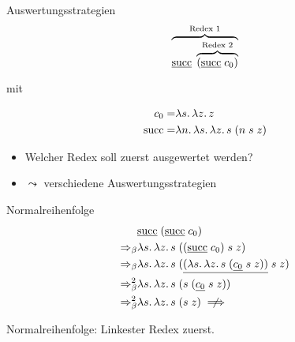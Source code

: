 \documentclass{beamer}
\begin{document}
\begin{frame}{Auswertungsstrategien}
        \begin{equation*}
          \overbrace{\app{
              \uline{\csucc}
            }{
              \overbrace{(\app{\uline{\csucc}}{\cn{0}})}^{\text{Redex 2}}
            }}^{\text{Redex 1}}
        \end{equation*}

        mit

        \begin{eqnarray*}
          c_{0} =& \lambda s.\, \lambda z.\, z \\
          \text{succ} =& \lambda n.\, \lambda s.\, \lambda z.\, s\;(n\;s\;z)
        \end{eqnarray*}

	\begin{itemize}
		\item Welcher Redex soll zuerst ausgewertet werden?
		\item $\leadsto$ verschiedene Auswertungsstrategien
	\end{itemize}
\end{frame}

\begin{frame}{Normalreihenfolge}
        \begin{eqnarray*}
          &
          \app{
            \uline{\csucc}
          }{
            (\app{\uline{\csucc}}{\cn{0}})
          } \\
          \Rightarrow_\beta&
          \lam{s}{\lam{z}{\app{s}{(\app{\app{(\app{\uline{\csucc}}{\cn{0}})}{s}}{z})}}} \\
          \Rightarrow_\beta&
          \lam{s}{\lam{z}{
            \app{s}{
              (\app{\app{\uline{(\lam{s}{\lam{z}{
                \app{s}{(\app{\app{\uline{\cn{0}}}{s}}{z})}
              }})}}{s}}{z})
            }
          }} \\
          \Rightarrow_\beta^2&
          \lam{s}{\lam{z}{
            \app{s}{(\app{s}{(\app{\app{\uline{\cn{0}}}{s}}{z})})}
          }} \\
          \Rightarrow_\beta^2&
          \lam{s}{\lam{z}{
            \app{s}{(\app{s}{z})}
          }} \centernot\implies
        \end{eqnarray*}

        \vfill

        Normalreihenfolge: Linkester Redex zuerst.
\end{frame}
\end{document}

